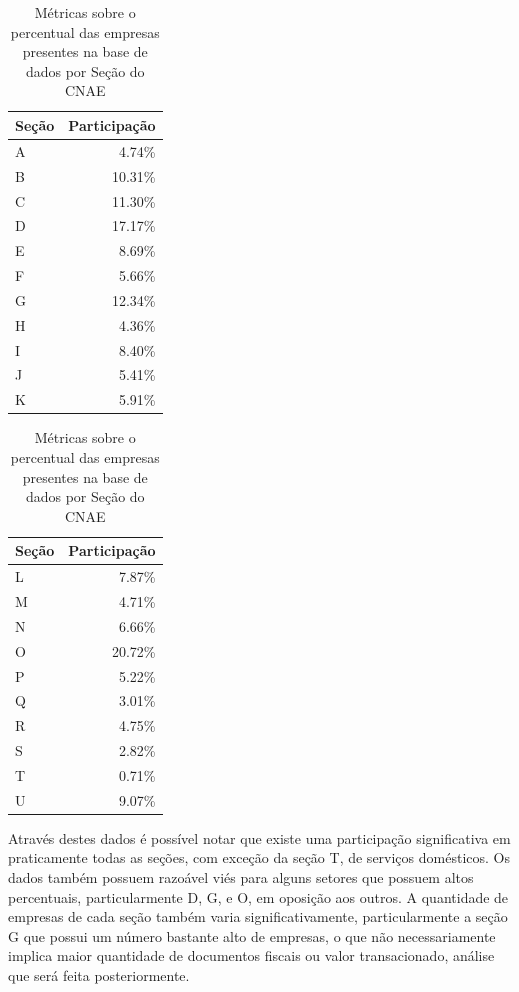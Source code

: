 \begin{table}[htb]
\centering
\caption{Métricas sobre o percentual das empresas presentes na base de dados por Seção do CNAE}
\label{tab:participacao-por-secao}
\begin{subtable}[h]{0.45\textwidth}
    \centering
    \begin{tabular}{l|r}
        \toprule
        Seção & Participação \\
        \midrule
        A     &     4.74\% \\
        B     &    10.31\% \\
        C     &    11.30\% \\
        D     &    17.17\% \\
        E     &     8.69\% \\
        F     &     5.66\% \\
        G     &    12.34\% \\
        H     &     4.36\% \\
        I     &     8.40\% \\
        J     &     5.41\% \\
        K     &     5.91\% \\
        \bottomrule
    \end{tabular}
\end{subtable}
\begin{subtable}[h]{0.45\textwidth}
    \centering
    \begin{tabular}{l|r}
        \toprule
        Seção & Participação \\
        \midrule
        L     &     7.87\% \\
        M     &     4.71\% \\
        N     &     6.66\% \\
        O     &    20.72\% \\
        P     &     5.22\% \\
        Q     &     3.01\% \\
        R     &     4.75\% \\
        S     &     2.82\% \\
        T     &     0.71\% \\
        U     &     9.07\% \\
        \bottomrule
    \end{tabular}
\end{subtable}
\fdadospesquisa
\end{table}

Através destes dados é possível notar que existe uma participação significativa em praticamente todas as seções, com exceção da seção T, de serviços domésticos. Os dados também possuem razoável viés para alguns setores que possuem altos percentuais, particularmente D, G, e O, em oposição aos outros. A quantidade de empresas de cada seção também varia significativamente, particularmente a seção G que possui um número bastante alto de empresas, o que não necessariamente implica maior quantidade de documentos fiscais ou valor transacionado, análise que será feita posteriormente.

